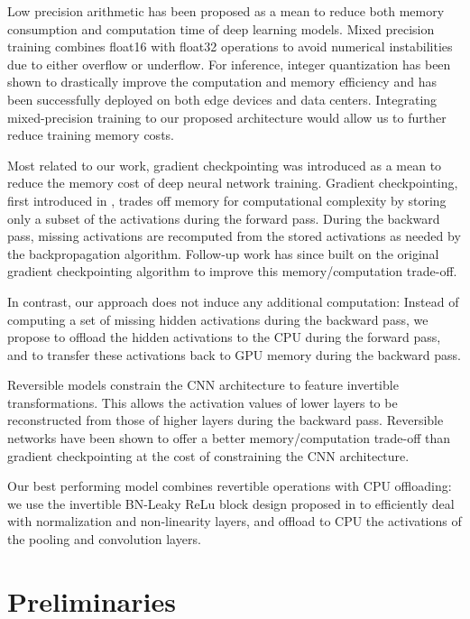 \documentclass[11pt,onecolumn]{article}
\begin{document}
Low precision arithmetic has been proposed as a mean to reduce 
both memory consumption and computation time of deep learning models.
Mixed precision training \cite{micikevicius2017mixed} combines float16 with float32 operations
to avoid numerical instabilities due to either overflow or underflow.
For inference,  integer quantization \cite{jacob2018quantization,wu2018training} 
has been shown to drastically improve the computation and memory efficiency 
and has been successfully deployed on both edge devices and data centers.
Integrating mixed-precision training to our proposed architecture would allow 
us to further reduce training memory costs. 

Most related to our work, gradient checkpointing was introduced as a mean 
to reduce the memory cost of deep neural network training.
Gradient checkpointing, first introduced in \cite{martens2012training}, 
trades off memory for computational complexity by storing only a subset of the activations during the forward pass.
During the backward pass, missing activations are recomputed from 
the stored activations as needed by the backpropagation algorithm.
Follow-up work \cite{chen2016training} has since built on the original gradient 
checkpointing algorithm to improve this memory/computation trade-off.  

In contrast, our approach does not induce any additional computation:
Instead of computing a set of missing hidden activations during the backward pass,
we propose to offload the hidden activations to the CPU during the forward pass,
and to transfer these activations back to GPU memory during the backward pass.

Reversible models \cite{xxx} constrain the CNN architecture to feature invertible transformations.
This allows the activation values of lower layers to be reconstructed from those of higher layers during
the backward pass. 
Reversible networks have been shown to offer a better memory/computation trade-off than 
gradient checkpointing at the cost of constraining the CNN architecture.

Our best performing model combines revertible operations with CPU offloading:
we use the invertible BN-Leaky ReLu block design proposed in \cite{xxx} 
to efficiently deal with normalization and non-linearity layers,
and offload to CPU the activations of the pooling and convolution layers.

\section{Preliminaries}
\end{document}
